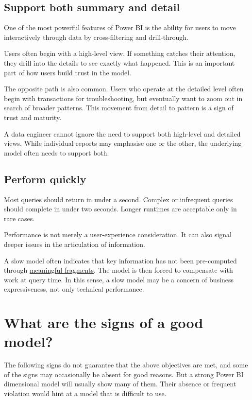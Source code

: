 \documentclass[10pt,openany,10pt]{book}
\begin{document}
\subsection{Support both summary and
detail}\label{support-both-summary-and-detail}

One of the most powerful features of Power BI is the ability for users
to move interactively through data by cross-filtering and drill-through.

Users often begin with a high-level view. If something catches their
attention, they drill into the details to see exactly what happened.
This is an important part of how users build trust in the model.

The opposite path is also common. Users who operate at the detailed
level often begin with transactions for troubleshooting, but eventually
want to zoom out in search of broader patterns. This movement from
detail to pattern is a sign of trust and maturity.

A data engineer cannot ignore the need to support both high-level and
detailed views. While individual reports may emphasise one or the other,
the underlying model often needs to support both.

\subsection{Perform quickly}\label{perform-quickly}

Most queries should return in under a second. Complex or infrequent
queries should complete in under two seconds. Longer runtimes are
acceptable only in rare cases.

Performance is not merely a user-experience consideration. It can also
signal deeper issues in the articulation of information.

A slow model often indicates that key information has not been
pre-computed through
\hyperref[docs-creating-information-meaningful-fragments]{meaningful
fragments}. The model is then forced to compensate with work at query
time. In this sense, a slow model may be a concern of business
expressiveness, not only technical performance.

\section{What are the signs of a good
model?}\label{what-are-the-signs-of-a-good-model}

The following signs do not guarantee that the above objectives are met,
and some of the signs may occasionally be absent for good reasons. But a
strong Power BI dimensional model will usually show many of them. Their
absence or frequent violation would hint at a model that is difficult to
use.
\end{document}
